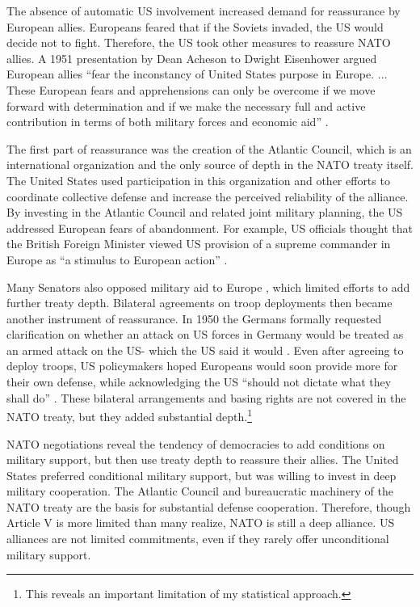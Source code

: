 \documentclass[12pt]{article}
\begin{document}
The absence of automatic US involvement increased demand for reassurance by European allies. 
Europeans feared that if the Soviets invaded, the US would decide not to fight. 
Therefore, the US took other measures to reassure NATO allies. 
A 1951 presentation by Dean Acheson to Dwight Eisenhower argued European allies ``fear the inconstancy of United States purpose in Europe. ... These European fears and apprehensions can only be overcome if we move forward with determination and if we make the necessary full and active contribution in terms of both military forces and economic aid'' \citep[pg. 3]{Acheson1951}. 


The first part of reassurance was the creation of the Atlantic Council, which is an international organization and the only source of depth in the NATO treaty itself. 
The United States used participation in this organization and other efforts to coordinate collective defense and increase the perceived reliability of the alliance. 
By investing in the Atlantic Council and related joint military planning, the US addressed European fears of abandonment. 
For example, US officials thought that the British Foreign Minister viewed US provision of a supreme commander in Europe as ``a stimulus to European action'' \citep{Acheson1950}. 


Many Senators also opposed military aid to Europe \citep[pg 285]{Acheson1969}, which limited efforts to add further treaty depth. 
Bilateral agreements on troop deployments then became another instrument of reassurance. 
In 1950 the Germans formally requested clarification on whether an attack on US forces in Germany would be treated as an armed attack on the US- which the US said it would \citep[pg. 395]{Acheson1969}.  
Even after agreeing to deploy troops, US policymakers hoped Europeans would soon provide more for their own defense, while acknowledging the US ``should not dictate what they shall do'' \citep[pg. 2]{Johnson1950}. 
These bilateral arrangements and basing rights are not covered in the NATO treaty, but they added substantial depth.\footnote{This reveals an important limitation of my statistical approach.}  


NATO negotiations reveal the tendency of democracies to add conditions on military support, but then use treaty depth to reassure their allies. 
The United States preferred conditional military support, but was willing to invest in deep military cooperation. 
The Atlantic Council and bureaucratic machinery of the NATO treaty are the basis for substantial defense cooperation. 
Therefore, though Article V is more limited than many realize, NATO is still a deep alliance. 
US alliances are not limited commitments, even if they rarely offer unconditional military support. 
\end{document}
